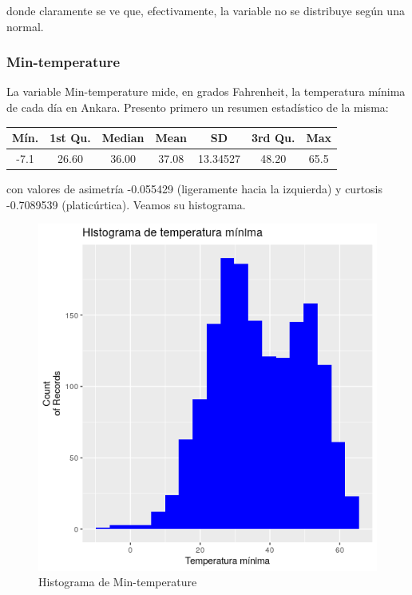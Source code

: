 donde claramente se ve que, efectivamente, la variable no se distribuye según una normal.

\subsubsection{Min-temperature}

La variable Min-temperature mide, en grados Fahrenheit, la temperatura mínima de cada día en Ankara. Presento primero un resumen estadístico de la misma:

\begin{table}[H]
	\centering
	\begin{tabular}{|c|c|c|c|c|c|c|}
		\hline
		Mín. & 1st Qu. & Median & Mean  & SD       & 3rd Qu. & Max  \\ \hline
		-7.1 & 26.60   & 36.00  & 37.08 & 13.34527 & 48.20   & 65.5 \\ \hline
	\end{tabular}
\end{table}

con valores de asimetría -0.055429 (ligeramente hacia la izquierda) y curtosis -0.7089539 (platicúrtica). Veamos su histograma.

\begin{figure}[H] %
	\centering
	\includegraphics[scale=0.7]{hist-min-temp.png}  %
	\caption{Histograma de Min-temperature} 
	\label{fig:hist-min-temp}
\end{figure}

